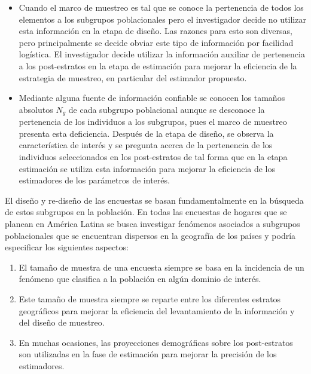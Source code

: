 \documentclass[12pt,spanish,]{book}
\providecommand{\tightlist}{%
  \setlength{\itemsep}{0pt}\setlength{\parskip}{0pt}}
\begin{document}
\begin{itemize}
  \begin{itemize}
  \tightlist
  \item
    Cuando el marco de muestreo es tal que se conoce la pertenencia de todos los elementos a los subgrupos poblacionales pero el investigador decide no utilizar esta información en la etapa de diseño. Las razones para esto son diversas, pero principalmente se decide obviar este tipo de información por facilidad logística. El investigador decide utilizar la información auxiliar de pertenencia a los post-estratos en la etapa de estimación para mejorar la eficiencia de la estrategia de muestreo, en particular del estimador propuesto.
  \item
    Mediante alguna fuente de información confiable se conocen los tamaños absolutos \(N_g\) de cada subgrupo poblacional aunque se desconoce la pertenencia de los individuos a los subgrupos, pues el marco de muestreo presenta esta deficiencia. Después de la etapa de diseño, se observa la característica de interés y se pregunta acerca de la pertenencia de los individuos seleccionados en los post-estratos de tal forma que en la etapa estimación se utiliza esta información para mejorar la eficiencia de los estimadores de los parámetros de interés.
  \end{itemize}
\end{itemize}

El diseño y re-diseño de las encuestas se basan fundamentalmente en la búsqueda de estos subgrupos en la población. En todas las encuestas de hogares que se planean en América Latina se busca investigar fenómenos asociados a subgrupos poblacionales que se encuentran dispersos en la geografía de los países y podría especificar los siguientes aspectos:

\begin{enumerate}
\def\labelenumi{\arabic{enumi}.}
\tightlist
\item
  El tamaño de muestra de una encuesta siempre se basa en la incidencia de un fenómeno que clasifica a la población en algún dominio de interés.
\item
  Este tamaño de muestra siempre se reparte entre los diferentes estratos geográficos para mejorar la eficiencia del levantamiento de la información y del diseño de muestreo.
\item
  En muchas ocasiones, las proyecciones demográficas sobre los post-estratos son utilizadas en la fase de estimación para mejorar la precisión de los estimadores.
\end{enumerate}
\end{document}
